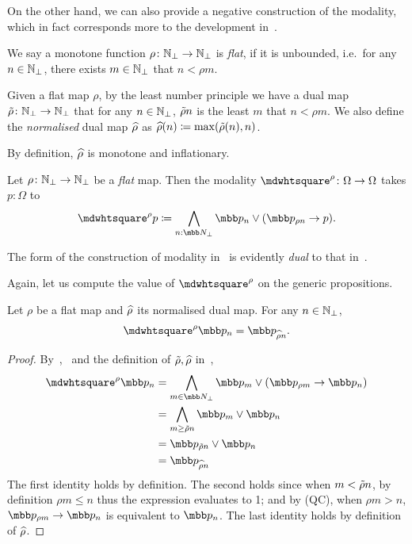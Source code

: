 On the other hand, we can also provide a negative construction of the modality, which in fact corresponds more to the development in~\citet{ESAKIA200097}.

\begin{definition}\label{flat}
  We say a monotone function $\rho \colon \mathbb{N}_\bot \to \mathbb{N}_\bot$ is \emph{flat}, if it is unbounded, i.e.\ for any $n\in\mathbb{N}_\bot$, there exists $m\in\mathbb{N}_\bot$ that $n < \rho m$. 
\end{definition}

\begin{definition}\label{dualmapofflat}
  Given a flat map $\rho$, by the least number principle we have a dual map $\tilde{\rho} \colon \mathbb{N}_\bot \to \mathbb{N}_\bot$ that for any $n\in\mathbb{N}_\bot$, $\tilde{\rho} n$ is the least $m$ that $n < \rho m$. We also define the \emph{normalised} dual map $\widehat{\rho}$ as $\widehat{\rho}(n) \coloneq \max(\tilde{\rho}(n),n)$.
\end{definition}

\begin{remark}
  By definition, $\widehat{\rho}$ is monotone and inflationary.
\end{remark}

\begin{construction}\label{consnegprop}
  Let $\rho \colon \mathbb{N}_\bot \to \mathbb{N}_\bot$ be a \emph{flat} map.
  Then the modality $\bx^\rho \colon \Omega \to \Omega$ takes $p:\Omega$ to
  \[ \bx^\rho p \coloneq \bigwedge_{n:\ovob} \mbb p_{n} \vee (\mbb p_{\rho n} \to p). \]
\end{construction}

\begin{remark}
  The form of the construction of modality in~ is evidently \emph{dual} to that in~.
\end{remark}

Again, let us compute the value of $\bx^\rho$ on the generic propositions.

\begin{proposition}\label{neglateronrep}
  Let $\rho$ be a flat map and $\widehat{\rho}$ its normalised dual map. For any $n\in\mathbb{N}_\bot$,
  \[ \bx^\rho\mbb p_{n} = \mbb p_{\pf\rho n}. \]
\end{proposition}
\begin{proof}
  By~,~ and the definition of $\tilde{\rho},\widehat{\rho}$ in~,
  \begin{align*}
    \bx^\rho\mbb p_{n} 
    &= \bigwedge_{m\in\ovob} \mbb p_{m} \vee (\mbb p_{\rho m} \to \mbb p_{n}) \\ 
    &= \bigwedge_{m \ge \qsi\rho n} \mbb p_{m} \vee \mbb p_{n} \\
    &= \mbb p_{\qsi\rho n} \vee \mbb p_{n}  \\
    &= \mbb p_{\pf\rho n} \qedhere
  \end{align*}
  The first identity holds by definition. The second holds since when $m < \tilde{\rho} n$, by definition $\rho m \le n$ thus the expression evaluates to 1; and by (QC), when $\rho m > n$, $\mbb p_{\rho m} \to \mbb p_{n}$ is equivalent to $\mbb p_{n}$. The last identity holds by definition of $\widehat{\rho}$.
\end{proof}

